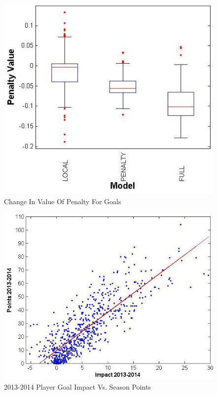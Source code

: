 \documentclass[]{article}
\begin{document}
\begin{figure}[ht]
\includegraphics[width = 1.0\columnwidth]{penalty_value_vs_graph}
\caption{Change In Value Of Penalty For Goals}
\label{fig:boxplot-penalty-values}
\end{figure}

\begin{figure}[ht]
\includegraphics[width = 1.0\columnwidth]{points_vs_impact}
\caption{2013-2014 Player Goal Impact Vs. Season Points}
\label{fig:points-vs-impact}
\end{figure}
\end{document}
